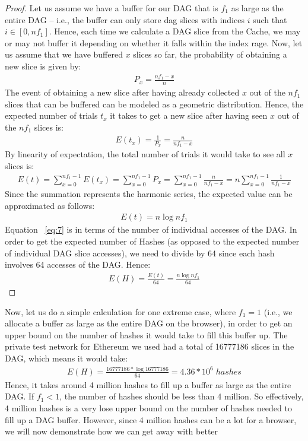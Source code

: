 \documentclass[runningheads]{llncs}
\begin{document}
\begin{proof}
Let us assume we have a buffer for our DAG that is $f_1$ as large as the entire DAG -- i.e., the buffer can only store dag slices with indices $i$ such that $i \in [0,nf_1]$. Hence, each time we calculate a DAG slice from the Cache, we may or may not buffer it depending on whether it falls within the index rage. Now, let us assume that  we have buffered $x$ slices so far, the probability of obtaining a new slice is given by:
\begin{gather}
  P_x = \frac{nf_1-x}{n}
\end{gather}
The event of obtaining a new slice after having already collected $x$ out of the $nf_1$ slices that can be buffered can be modeled as a geometric distribution. Hence, the expected number of trials $t_x$ it takes to get a new  slice after having seen $x$ out of the $nf_1$ slices is:
\begin{gather}
  E(t_x) = \frac{1}{P_x} = \frac{n}{nf_1-x}
\end{gather}
By linearity of expectation, the total number of trials it would take to see all $x$ slices is:
\begin{gather}
  E(t) = \sum_{x=0}^{nf_1-1}E(t_x) = \sum_{x=0}^{nf_1-1}P_x = \sum_{x=0}^{nf_1-1}\frac{n}{nf_1-x} = n\sum_{x=0}^{nf_1-1}\frac{1}{nf_1-x}
\end{gather}
Since the summation represents the harmonic series, the expected value can be approximated as follows:
\begin{gather}
  E(t) = n\log{nf_1}
\end{gather}
Equation ~\ref{eq:7} is in terms of the number of individual accesses of the DAG. In order to get the expected number of Hashes (as opposed to the expected number of individual DAG slice accesses), we need to divide by 64 since each hash involves 64 accesses of the DAG. Hence: 
\begin{gather}
  E(H) = \frac{E(t)}{64} = \frac{n\log{nf_1}}{64}
\end{gather}
\end{proof}
Now, let us do a simple calculation for one extreme case, where $f_1 = 1$ (i.e., we allocate a buffer as large as the entire DAG on the browser), in order to get an upper bound on the number of hashes it would take to fill this buffer up. The private test network for Ethereum we used had a total of 16777186 slices in the DAG, which means it would take:
\begin{gather}
  E(H) = \frac{16777186*\log{16777186}}{64} = 4.36*10^6\;hashes
\end{gather}
Hence, it takes around 4 million hashes to fill up a buffer as large as the entire DAG. If $f_1 < 1$, the number of hashes should be less than 4 million. So effectively, 4 million hashes is a very lose upper bound on the number of hashes needed to fill up a DAG buffer. However, since 4 million hashes can be a lot for a browser, we will now demonstrate how we can get away with  better
\end{document}
